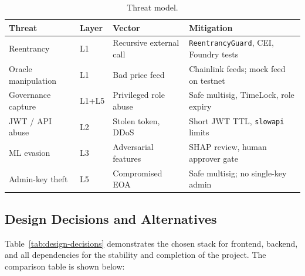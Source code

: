 \documentclass[12pt,a4paper]{report}
\newcommand{\tableheadcolor}{\rowcolor{TableHeadBg}}
\begin{document}
\begin{table}[H]
\centering
\caption[Threat model]{Threat model.}
\label{tab:threat-model}
\footnotesize
\begin{tabular}{@{}p{2.4cm}p{1.0cm}p{3.2cm}p{6.8cm}@{}}
\toprule
\tableheadcolor
\textbf{Threat} & \textbf{Layer} & \textbf{Vector} & \textbf{Mitigation} \\
\midrule
Reentrancy & L1 & Recursive external call & \texttt{ReentrancyGuard}, CEI, Foundry tests \\
Oracle manipulation & L1 & Bad price feed & Chainlink feeds; mock feed on testnet \\
Governance capture & L1+L5 & Privileged role abuse & Safe multisig, TimeLock, role expiry \\
JWT / API abuse & L2 & Stolen token, DDoS & Short JWT TTL, \texttt{slowapi} limits \\
ML evasion & L3 & Adversarial features & SHAP review, human approver gate \\
Admin-key theft & L5 & Compromised EOA & Safe multisig; no single-key admin \\
\bottomrule
\end{tabular}
\end{table}




\subsection{Design Decisions and Alternatives}

Table~\ref{tab:design-decisions} demonstrates the chosen stack for frontend, backend, and all dependencies for the stability and completion of the project. The comparison table is shown below:
\end{document}
